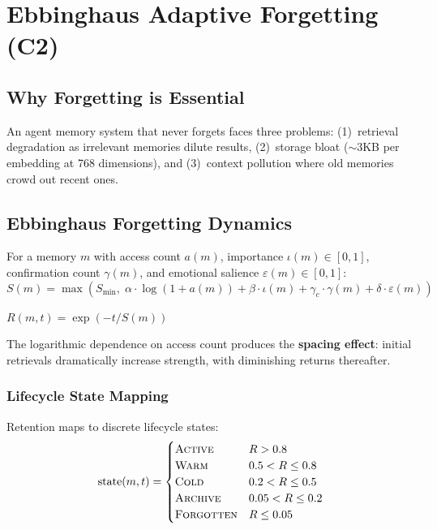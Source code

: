 \section{Ebbinghaus Adaptive Forgetting (C2)}
\label{sec:forgetting}

\subsection{Why Forgetting is Essential}

An agent memory system that never forgets faces three problems: (1)~retrieval degradation as irrelevant memories dilute results, (2)~storage bloat ($\sim$3KB per embedding at 768 dimensions), and (3)~context pollution where old memories crowd out recent ones.

\subsection{Ebbinghaus Forgetting Dynamics}

\begin{definition}
For a memory $m$ with access count $a(m)$, importance $\iota(m) \in [0,1]$, confirmation count $\gamma(m)$, and emotional salience $\varepsilon(m) \in [0,1]$:
\begin{equation}
S(m) = \max\!\left(S_{\min},\; \alpha \cdot \log(1 + a(m)) + \beta \cdot \iota(m) + \gamma_c \cdot \gamma(m) + \delta \cdot \varepsilon(m)\right)
\label{eq:strength}
\end{equation}
\end{definition}

\begin{definition}[Retention]
$R(m, t) = \exp\left(-t / S(m)\right)$
\label{eq:retention}
\end{definition}

The logarithmic dependence on access count produces the \textbf{spacing effect}: initial retrievals dramatically increase strength, with diminishing returns thereafter.

\subsubsection{Lifecycle State Mapping}

Retention maps to discrete lifecycle states:
\begin{equation}
\text{state}(m, t) = \begin{cases}
\textsc{Active} & R > 0.8 \\
\textsc{Warm} & 0.5 < R \leq 0.8 \\
\textsc{Cold} & 0.2 < R \leq 0.5 \\
\textsc{Archive} & 0.05 < R \leq 0.2 \\
\textsc{Forgotten} & R \leq 0.05
\end{cases}
\label{eq:lifecycle}
\end{equation}

